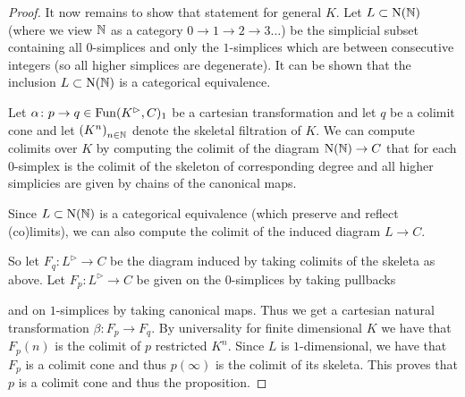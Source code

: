 \begin{lemma}
\begin{proof}
        It now remains to show that statement for general $K$.
        Let $L\subset\operatorname{N}(\mathbb{N})$ (where we view $\mathbb{N}$ as a category $0\to1\to2\to3\ldots$) be the simplicial subset containing all $0$-simplices and only the $1$-simplices which are between consecutive integers (so all higher simplices are degenerate).
        It can be shown that the inclusion $L\subset\operatorname{N}(\mathbb{N})$ is a categorical equivalence. %

        Let $\alpha\colon p\to q\in\operatorname{Fun}(K^{\rhd},C)_1$ be a cartesian transformation and let $q$ be a colimit cone and let $\left(K^n\right)_{n\in\mathbb{N}}$ denote the skeletal filtration of $K$.
        We can compute colimits over $K$ by computing the colimit of the diagram $\operatorname{N}(\mathbb{N})\to C$ that for each $0$-simplex is the colimit of the skeleton of corresponding degree and all higher simplicies are given by chains of the canonical maps. 

        Since $L\subset\operatorname{N}(\mathbb{N})$ is a categorical equivalence (which preserve and reflect (co)limits), we can also compute the colimit of the induced diagram $L\to C$.

        So let $F_q\colon L^{\rhd}\to C$ be the diagram induced by taking colimits of the skeleta as above.
        Let $F_p\colon L^{\rhd}\to C$ be given on the $0$-simplices by taking pullbacks
        \begin{center}
        \end{center}
        and on $1$-simplices by taking canonical maps.
        Thus we get a cartesian natural transformation $\beta\colon F_p\to F_q$.
        By universality for finite dimensional $K$ we have that $F_p(n)$ is the colimit of $p$ restricted $K^n$.
        Since $L$ is $1$-dimensional, we have that $F_p$ is a colimit cone and thus $p(\infty)$ is the colimit of its skeleta.
        This proves that $p$ is a colimit cone and thus the proposition.
    \end{proof}
\end{lemma}
